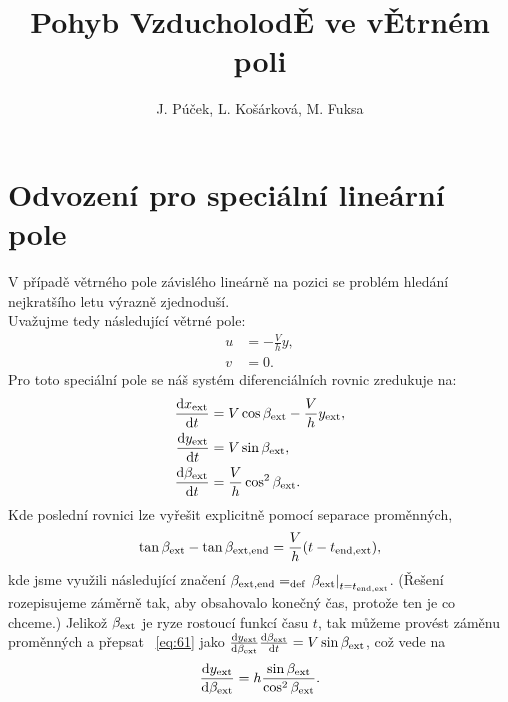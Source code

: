 \documentclass[reqno, a4paper]{amsart}
\author{J. Púček, L. Košárková, M. Fuksa}
\title{Pohyb Vzducholod\v{E} ve v\v{E}trném poli}
\begin{document}
\maketitle
\section{Odvození pro speciální lineární pole}
\label{sec:teorie}
V případě větrného pole závislého lineárně na pozici se problém hledání nejkratšího letu výrazně zjednoduší. \\
Uvažujme tedy následující větrné pole:
\begin{subequations}
  \label{eq:56}
  \begin{align}
    \label{eq:57}
    u &= - \frac{V}{h}y, \\
    \label{eq:58}
    v &= 0.
  \end{align}
\end{subequations}
Pro toto speciální pole se náš systém diferenciálních rovnic zredukuje na:
\begin{subequations}
  \label{eq:59}
  \begin{align}
    \label{eq:60}
    \frac{\mathrm{d} {x_{\mathrm{ext}}}}{\mathrm{d} {t}}
    &=
      V \cos \beta_{\mathrm{ext}} - \frac{V}{h}y_{\mathrm{ext}},  \\
    \label{eq:61}
    \frac{\mathrm{d} {y_{\mathrm{ext}}}}{\mathrm{d} {t}}
    &=
      V \sin \beta_{\mathrm{ext}},  \\
    \label{eq:62}
    \frac{\mathrm{d} {\beta_{\mathrm{ext}}}}{\mathrm{d} {t}}
    &=
      \frac{V}{h}
      \cos^2 \beta_{\mathrm{ext}}
      .
  \end{align}
\end{subequations}
Kde poslední rovnici lze vyřešit explicitně pomocí separace proměnných,
\begin{equation}
  \label{eq:63}
  \tan \beta_{\mathrm{ext}} -  \tan \beta_{\mathrm{ext}, \mathrm{end}} = \frac{V}{h} (t - t_{\mathrm{end}, \mathrm{ext}}), 
\end{equation}
kde jsme využili následující značení $\beta_{\mathrm{ext}, \mathrm{end}} = _{\mathrm{def}} \left. \beta_{\mathrm{ext}} \right|_{t = t_{\mathrm{end}, \mathrm{ext}}} $. (Řešení rozepisujeme záměrně tak, aby obsahovalo konečný čas, protože ten je co chceme.) Jelikož $\beta_{\mathrm{ext}}$ je ryze rostoucí funkcí času $t$, tak můžeme provést záměnu proměnných a přepsat ~\eqref{eq:61} jako
$
  \frac{\mathrm{d} {y_{\mathrm{ext}}}}{\mathrm{d} {\beta_{\mathrm{ext}}}} \frac{\mathrm{d} {\beta_{\mathrm{ext}}}}{\mathrm{d} {t}}
  =
  V \sin \beta_{\mathrm{ext}}
$,
což vede na
\begin{equation}
  \label{eq:64}
  \frac{\mathrm{d} {y_{\mathrm{ext}}}}{\mathrm{d} {\beta_{\mathrm{ext}}}} = h \frac{\sin \beta_{\mathrm{ext}}}{\cos^2 \beta_{\mathrm{ext}}}.
\end{equation}
\end{document}
